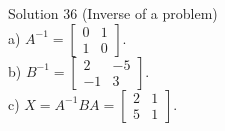 \documentclass[10pt]{article}
\begin{document}
Solution 36 (Inverse of a problem)\\
a) $A^{-1}=\left[\begin{array}{ll}0 & 1 \\ 1 & 0\end{array}\right]$.\\
b) $B^{-1}=\left[\begin{array}{cc}2 & -5 \\ -1 & 3\end{array}\right]$.\\
c) $X=A^{-1} B A=\left[\begin{array}{ll}2 & 1 \\ 5 & 1\end{array}\right]$.
\end{document}
